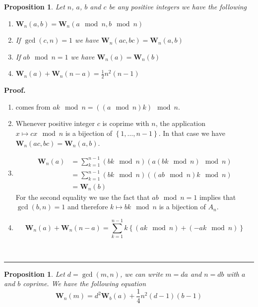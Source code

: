 \documentclass{article}%
\newtheorem{proposition}[theorem]{Proposition}
\newenvironment{proof}[1][Proof]{\textbf{#1.} }{\ \rule{0.5em}{0.5em}}
\newcommand{\SUMW}[2]{\mathbf{W}_{#1}\left(#2\right)}
\begin{document}
\begin{proposition}\label{prop:basic_properties_W}
Let $n$, $a$, $b$ and $c$ be any positive integers we have the following
\begin{center}
\begin{enumerate}[i]
	\item $\SUMW{n}{a,b}=\SUMW{n}{a\mod n,b\mod n}$
	\item If $\gcd(c,n)=1$ we have $\SUMW{n}{ac,bc}=\SUMW{n}{a,b}$
	\item If $ab\mod n=1$ we have $\SUMW{n}{a}=\SUMW{n}{b}$
	\item $\SUMW{n}{a}+\SUMW{n}{n-a}=\frac{1}{2}n^2(n-1)$
\end{enumerate}
\end{center}
\end{proposition}
\begin{proof} 
\begin{enumerate}[i]
  \item comes from $ak\mod n=((a\mod n)k)\mod n$. 
	\item Whenever positive integer $c$ is coprime with $n$, the application $x\mapsto cx\mod n$ is a bijection of $\left\{1,\ldots,n-1\right\}$. In that case we have $\SUMW{n}{ac,bc}=\SUMW{n}{a,b}$.
	\item \begin{align*}
\SUMW{n}{a} 
&= \sum_{k=1}^{n-1}(bk\mod n)(a(bk\mod n)\mod n) \\
&= \sum_{k=1}^{n-1}(bk\mod n)((ab\mod n)k\mod n) \\
&= \SUMW{n}{b}
\end{align*}
For the second equality we use the fact that $ab\mod n=1$ implies that $\gcd(b,n)=1$ and therefore $k\mapsto bk\mod n$ is a bijection of $A_n$.
	\item \begin{equation*}
\SUMW{n}{a}+\SUMW{n}{n-a} = \sum_{k=1}^{n-1} k \left\{(ak \mod n)+(-ak \mod n) \right\} 
\end{equation*}
\end{enumerate}
\end{proof}

\begin{proposition}\label{prop:rel_Wnm_Wba}
Let $d=\gcd(m,n)$, we can write $m=da$ and $n=db$ with $a$ and $b$ coprime. We have the following equation
\begin{equation}
\SUMW{n}{m} = d^2 \SUMW{b}{a} + \frac{1}{4}n^2(d-1)(b-1)
\label{eq:rel_Wnm_Wba}
\end{equation}
 
\end{proposition}
\end{document}
